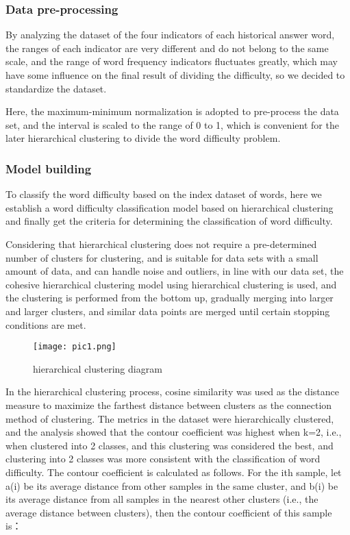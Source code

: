 \documentclass[12pt]{article}  %
\begin{document}
\subsubsection{Data pre-processing}

By analyzing the dataset of the four indicators of each historical answer word, the ranges of each indicator are very different and do not belong to the same scale, and the range of word frequency indicators fluctuates greatly, which may have some influence on the final result of dividing the difficulty, so we decided to standardize the dataset.

Here, the maximum-minimum normalization is adopted to pre-process the data set, and the interval is scaled to the range of 0 to 1, which is convenient for the later hierarchical clustering to divide the word difficulty problem.

\subsubsection{Model building}

To classify the word difficulty based on the index dataset of words, here we establish a word difficulty classification model based on hierarchical clustering and finally get the criteria for determining the classification of word difficulty.

Considering that hierarchical clustering does not require a pre-determined number of clusters for clustering, and is suitable for data sets with a small amount of data, and can handle noise and outliers, in line with our data set, the cohesive hierarchical clustering model using hierarchical clustering is used, and the clustering is performed from the bottom up, gradually merging into larger and larger clusters, and similar data points are merged until certain stopping conditions are met.

\begin{figure}[H]
	\centering
	\texttt{[image: pic1.png]}
	\caption{hierarchical clustering diagram}
	\label{img13}
\end{figure}

In the hierarchical clustering process, cosine similarity was used as the distance measure to maximize the farthest distance between clusters as the connection method of clustering. The metrics in the dataset were hierarchically clustered, and the analysis showed that the contour coefficient was highest when k=2, i.e., when clustered into 2 classes, and this clustering was considered the best, and clustering into 2 classes was more consistent with the classification of word difficulty.
The contour coefficient is calculated as follows.
For the ith sample, let a(i) be its average distance from other samples in the same cluster, and b(i) be its average distance from all samples in the nearest other clusters (i.e., the average distance between clusters), then the contour coefficient of this sample is：
\end{document}
